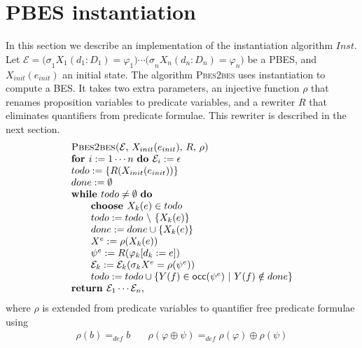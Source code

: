 \documentclass{article}
\begin{document}
\section{PBES instantiation}

In this section we describe an implementation of the instantiation algorithm 
$Inst$. Let $\mathcal{E=(\sigma }_{1}X_{1}(d_{1}:D_{1})=\varphi _{1})\cdots 
\mathcal{(\sigma }_{n}X_{n}(d_{n}:D_{n})=\varphi _{n})$ be a PBES, and $%
X_{init}(e_{init})$ an initial state. The algorithm \textsc{Pbes2bes} uses
instantiation to compute a BES. It takes two extra parameters, an injective
function $\rho $ that renames proposition variables to predicate variables,
and a rewriter $R$ that eliminates quantifiers from predicate formulae. This
rewriter is described in the next section.%
\begin{equation*}
\begin{array}{l}
\text{\textsc{Pbes2bes(}}\mathcal{E}\text{, }X_{init}(e_{init})\text{, }R%
\text{, }\rho \text{\textsc{)}} \\ 
\text{\textbf{for }}i:=1\cdots n\text{ \textbf{do }}\mathcal{E}_{i}:=\epsilon
\\ 
todo:=\{R(X_{init}(e_{init}))\} \\ 
done:=\emptyset \\ 
\text{\textbf{while }}todo\neq \emptyset \text{ \textbf{do}} \\ 
\qquad \text{\textbf{choose }}X_{k}(e)\in todo \\ 
\qquad todo:=todo\ \backslash \ \{X_{k}(e)\} \\ 
\qquad done:=done\cup \{X_{k}(e)\} \\ 
\qquad X^{e}:=\rho (X_{k}(e)) \\ 
\qquad \psi ^{e}:=R(\varphi _{k}[d_{k}:=e]) \\ 
\qquad \mathcal{E}_{k}:=\mathcal{E}_{k}(\mathcal{\sigma }_{k}X^{e}=\rho
(\psi ^{e})) \\ 
\qquad todo:=todo\cup \{Y(f)\in \mathsf{occ}(\psi ^{e})\ |\ Y(f)\notin done\}
\\ 
\text{\textbf{return }}\mathcal{E}_{1}\cdots \mathcal{E}_{n},%
\end{array}%
\end{equation*}%
where $\rho $ is extended from predicate variables to quantifier free
predicate formulae using%
\begin{equation*}
\begin{array}{cc}
\rho (b)=_{def}b & \quad \rho (\varphi \oplus \psi )=_{def}\rho (\varphi
)\oplus \rho (\psi )%
\end{array}%
\end{equation*}
\end{document}
